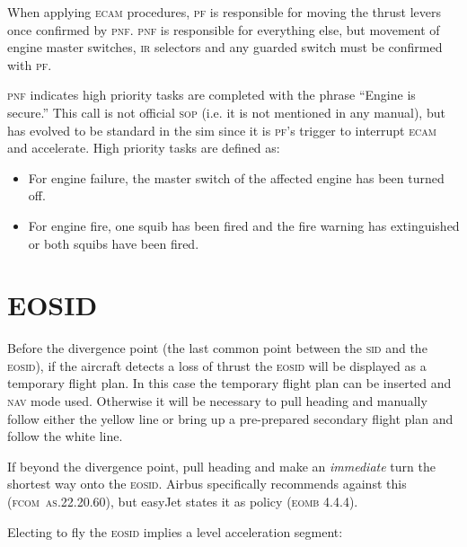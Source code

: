 \documentclass[a5paper,11pt,twoside]{book}
\newcommand{\ac}[1]{{\scshape\MakeLowercase{#1}}}
\newcommand{\inlcite}[1]{{\ac{#1}}}
\newcommand{\multicite}[1]{%
  \nopagebreak
  \noindent{{\color{blue}\footnotesize[ \inlcite{#1} ]}}
}
\begin{document}
When applying \ac{ECAM} procedures, \ac{PF} is responsible for moving the thrust
levers once confirmed by \ac{PNF}. \ac{PNF} is responsible for everything else,
but movement of engine master switches, \ac{IR} selectors and any guarded switch
must be confirmed with \ac{PF}.

\ac{PNF} indicates high priority tasks are completed with the phrase ``Engine is
secure.''  This call is not official \ac{SOP} (i.e. it is not mentioned in any
manual), but has evolved to be standard in the sim since it is \ac{PF}'s trigger
to interrupt \ac{ECAM} and accelerate.  High priority tasks are defined as:

\begin{itemize}
\item For engine failure, the master switch of the affected engine has been
  turned off.

\item For engine fire, one squib has been fired and the fire warning has
  extinguished or both squibs have been fired.
\end{itemize}

\multicite{FCTM~PRO.AEP.ENG}


\section{EOSID}
\label{sec-eosid}

Before the divergence point (the last common point between the \ac{SID} and the
\ac{EOSID}), if the aircraft detects a loss of thrust the \ac{EOSID} will be
displayed as a temporary flight plan. In this case the temporary flight plan can
be inserted and \ac{NAV} mode used. Otherwise it will be necessary to pull
heading and manually follow either the yellow line or bring up a pre-prepared
secondary flight plan and follow the white line.

If beyond the divergence point, pull heading and make an \emph{immediate} turn
the shortest way onto the \ac{EOSID}. Airbus specifically recommends against
this (\inlcite{FCOM~AS.22.20.60}), but easyJet states it as policy
(\inlcite{EOMB 4.4.4}).

Electing to fly the \ac{EOSID} implies a level acceleration segment:
\end{document}
